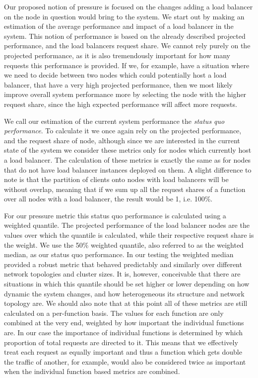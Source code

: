 \documentclass[draft,final]{vutinfth} %
\begin{document}
Our proposed notion of pressure is focused on the changes adding a load balancer on the node in question would bring to the system.
We start out by making an estimation of the average performance and impact of a load balancer in the system.
This notion of performance is based on the already described projected performance, and the load balancers request share.
We cannot rely purely on the projected performance, as it is also tremendously important for how many requests this performance is provided.
If we, for example, have a situation where we need to decide between two nodes which could potentially host a load balancer, that have a very high projected performance, then we most likely improve overall system performance more by selecting the node with the higher request share, since the high expected performance will affect more requests.

We call our estimation of the current system performance the \textit{status quo performance}.
To calculate it we once again rely on the projected performance, and the request share of node, although since we are interested in the current state of the system we consider these metrics only for nodes which currently host a load balancer.
The calculation of these metrics is exactly the same as for nodes that do not have load balancer instances deployed on them.
A slight difference to note is that the partition of clients onto nodes with load balancers will be without overlap, meaning that if we sum up all the request shares of a function over all nodes with a load balancer, the result would be 1, i.e. 100\%.

For our pressure metric this status quo performance is calculated using a weighted quantile.
The projected performance of the load balancer nodes are the values over which the quantile is calculated, while their respective request share is the weight.
We use the 50\% weighted quantile, also referred to as the weighted median, as our status quo performance.
In our testing the weighted median provided a robust metric that behaved predictably and similarly over different network topologies and cluster sizes.
It is, however, conceivable that there are situations in which this quantile should be set higher or lower depending on how dynamic the system changes, and how heterogeneous its structure and network topology are.
We should also note that at this point all of these metrics are still calculated on a per-function basis.
The values for each function are only combined at the very end, weighted by how important the individual functions are.
In our case the importance of individual functions is determined by which proportion of total requests are directed to it.
This means that we effectively treat each request as equally important and thus a function which gets double the traffic of another, for example, would also be considered twice as important when the individual function based metrics are combined.
\end{document}
